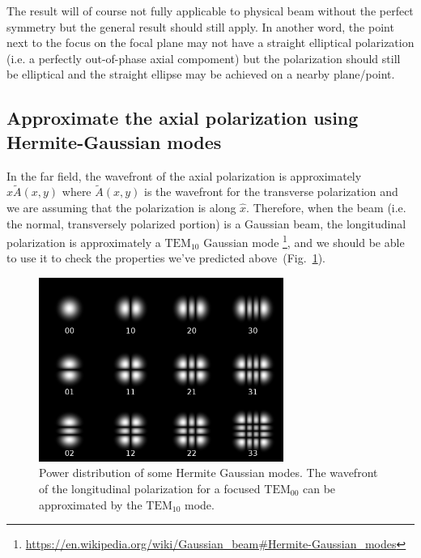 \documentclass[10pt,fleqn]{article}
\begin{document}
The result will of course not fully applicable to physical beam
without the perfect symmetry but the general result should still apply.
In another word, the point next to the focus on the focal plane may not have
a straight elliptical polarization (i.e. a perfectly out-of-phase axial compoment)
but the polarization should still be elliptical and the straight ellipse
may be achieved on a nearby plane/point.\\

\subsection{Approximate the axial polarization using Hermite-Gaussian modes}
\label{sec:semi:hermite}
In the far field, the wavefront of the axial polarization is approximately
$x \tilde A(x, y)$ where $\tilde A(x, y)$ is the wavefront for
the transverse polarization and we are assuming that the polarization is along $\hat x$.
Therefore, when the beam (i.e. the normal, transversely polarized portion)
is a Gaussian beam, the longitudinal polarization is approximately a $\mathrm{TEM}_{10}$
Gaussian mode
\footnote{\url{https://en.wikipedia.org/wiki/Gaussian_beam\#Hermite-Gaussian_modes}},
and we should be able to use it to check the properties we've predicted above~(Fig.~\ref{fig:hermite-gaussian}).\\

\begin{figure}[h]
  \centering
  \includegraphics[width=8cm]{imgs/Hermite-gaussian.png}
  \caption{Power distribution of some Hermite Gaussian modes.
    The wavefront of the longitudinal polarization for a focused $\mathrm{TEM}_{00}$
    can be approximated by the $\mathrm{TEM}_{10}$ mode.}
  \label{fig:hermite-gaussian}
\end{figure}
\end{document}
